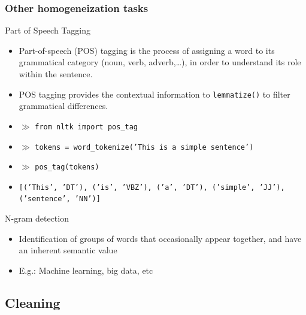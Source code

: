 \documentclass{beamer}
\begin{document}
\begin{frame}

    \frametitle{Other homogeneization tasks}
    
    	\begin{block}{Part of Speech Tagging}
    	\begin{itemize}
    	\item Part-of-speech (POS) tagging is the process of assigning a word to its grammatical category (noun, verb, adverb,…), in order to understand its role within the sentence.
    	\item POS tagging provides the contextual information to {\tt lemmatize()} to filter grammatical differences.

    	\end{itemize}
    	\end{block}
    	
    	\begin{itemize}
    		\footnotesize
    		\item[] $\gg$ {\tt from nltk import pos\_tag}
    		\item[] $\gg$ {\tt tokens = word\_tokenize('This is a simple sentence') }
    		\item[] $\gg$ {\tt pos\_tag(tokens)}
    		\item[] {\tt [('This', 'DT'), ('is', 'VBZ'), ('a', 'DT'), ('simple', 'JJ'), ('sentence', 'NN')]}
       	\end{itemize}
    
    	\begin{block}{N-gram detection}
        	\begin{itemize}
        	\item Identification of groups of words that occasionally appear together, and have an inherent semantic value
        	\item E.g.: Machine learning, big data, etc
        	\end{itemize}
        \end{block}
    
\end{frame}


\subsection{Cleaning}
\end{document}
